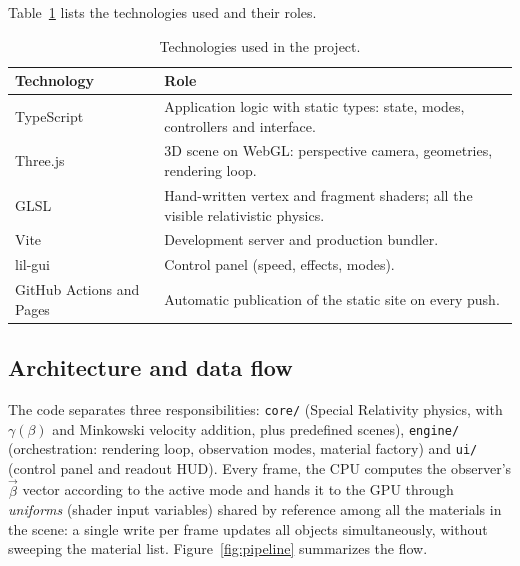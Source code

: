 \documentclass[10pt,a4paper,twocolumn]{article}
\begin{document}
Table~\ref{tab:stack} lists the technologies used and their roles.

\begin{table}[t]
  \centering
  \caption{Technologies used in the project.}
  \label{tab:stack}
  \small
  \begin{tabular}{@{}>{\raggedright\arraybackslash}p{}p{}@{}}
    \toprule
    Technology & Role \\
    \midrule
    TypeScript & Application logic with static types: state, modes,
                 controllers and interface. \\
    Three.js   & 3D scene on WebGL: perspective camera, geometries,
                 rendering loop. \\
    GLSL       & Hand-written vertex and fragment shaders; all the
                 visible relativistic physics. \\
    Vite       & Development server and production bundler. \\
    lil-gui    & Control panel (speed, effects, modes). \\
    GitHub Actions and Pages & Automatic publication of the static site on every
                 push. \\
    \bottomrule
  \end{tabular}
\end{table}

\subsection{Architecture and data flow}

The code separates three responsibilities: \texttt{core/} (Special Relativity physics,
with $\gamma(\beta)$ and Minkowski velocity addition, plus predefined scenes),
\texttt{engine/} (orchestration: rendering loop, observation modes, material factory) and
\texttt{ui/} (control panel and readout HUD). Every frame, the CPU computes the
observer's $\vec{\beta}$ vector according to the active mode and hands it to the GPU
through \emph{uniforms} (shader input variables) shared by reference among all the
materials in the scene: a single write per frame updates all objects simultaneously,
without sweeping the material list. Figure~\ref{fig:pipeline} summarizes the flow.
\end{document}
